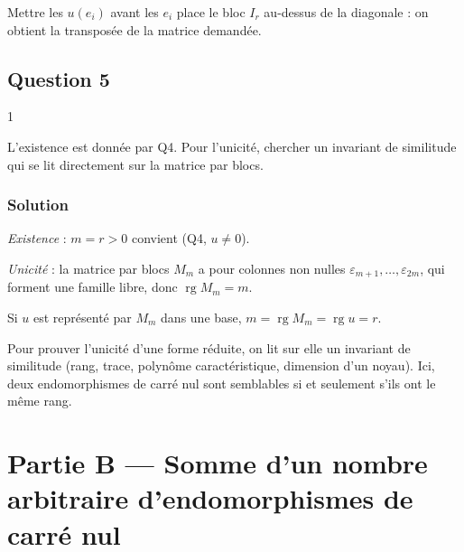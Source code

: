 \documentclass[11pt,a4paper]{article}
\newcommand{\equationajustee}[1]{%
  \sbox{\boiteequation}{$\displaystyle #1$}%
  \ifdim\wd\boiteequation>\linewidth
    \[\resizebox{\linewidth}{!}{\usebox{\boiteequation}}\]%
  \else
    \[#1\]%
  \fi}
\begin{document}
\begin{piege}

Mettre les \(u(e_i)\) avant les \(e_i\) place le bloc \(I_r\) au-dessus de la diagonale : on obtient la transposée de la matrice demandée.

\end{piege}

\hypertarget{question-5}{%
\subsection{Question 5}\label{question-5}}

\begin{indication}{1}

L'existence est donnée par Q4. Pour l'unicité, chercher un invariant de similitude qui se lit directement sur la matrice par blocs.

\end{indication}

\hypertarget{solution-4}{%
\subsubsection{Solution}\label{solution-4}}

\emph{Existence} : \(m=r>0\) convient (Q4, \(u\neq0\)).

\emph{Unicité} : la matrice par blocs \(M_m\) a pour colonnes non nulles \(\varepsilon_{m+1},\dots,\varepsilon_{2m}\), qui forment une famille libre, donc \(\operatorname{rg}M_m=m\).

Si \(u\) est représenté par \(M_m\) dans une base, \(m=\operatorname{rg}M_m=\operatorname{rg}u=r\).
\equationajustee{\boxed{m=\operatorname{rg}(u).}}

\begin{methode}

Pour prouver l'unicité d'une forme réduite, on lit sur elle un invariant de similitude (rang, trace, polynôme caractéristique, dimension d'un noyau). Ici, deux endomorphismes de carré nul sont semblables si et seulement s'ils ont le même rang.

\end{methode}

\hypertarget{partie-b-somme-dun-nombre-arbitraire-dendomorphismes-de-carruxe9-nul}{%
\section{Partie B --- Somme d'un nombre arbitraire d'endomorphismes de carré nul}\label{partie-b-somme-dun-nombre-arbitraire-dendomorphismes-de-carruxe9-nul}}
\end{document}

